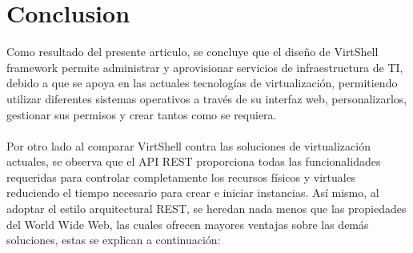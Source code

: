 \documentclass[conference, spanish]{IEEEtran}
\begin{document}




\section{Conclusion}
Como resultado del presente articulo, se concluye que el diseño de VirtShell framework permite administrar y aprovisionar servicios de infraestructura de TI, debido a que se apoya en las actuales tecnologías de virtualización, permitiendo utilizar diferentes sistemas operativos a través de su interfaz web, personalizarlos, gestionar sus permisos y crear tantos como se requiera.\\
\\
Por otro lado al comparar VirtShell contra las soluciones de virtualización actuales, se observa que el API REST proporciona todas las funcionalidades requeridas para controlar completamente los recursos físicos y virtuales reduciendo el tiempo necesario para crear e iniciar instancias. Así mismo, al adoptar el estilo arquitectural REST, se heredan nada menos que las propiedades del World Wide Web, las cuales ofrecen mayores ventajas sobre las demás soluciones, estas se explican a continuación:
\end{document}
